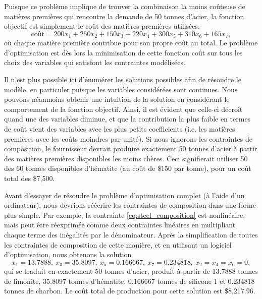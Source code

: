 \begin{example}
Puisque ce problème implique de trouver la combinaison la moins coûteuse de matières premières qui rencontre la demande de 50 tonnes d'acier, la fonction objectif est simplement le coût des matières premières utilisées:
\[
\mbox{coût} = 200 x_1 + 250 x_2 + 150 x_3 + 220 x_4 + 300 x_5 + 310 x_6 + 165 x_7,
\]
où chaque matière première contribue pour son propre coût au total.
Le problème d'optimisation est dès lors la minimisation de cette fonction coût sur tous les choix des variables qui satisfont les contraintes modélisées.

Il n'est plus possible ici d'énumérer les solutions possibles afin de résoudre le modèle, en particuler puisque les variables considérées sont continues.
Nous pouvons néanmoins obtenir une intuition de la solution en considérant le comportement de la fonction objectif.
Ainsi, il est évident que celle-ci décroît quand une des variables diminue, et que la contribution la plus faible en termes de coût vient des variables avec les plus petits coefficients (i.e. les matières premières avec les coûts moindres par unité).
Si nous ignorons les contraintes de composition, le fournisseur devrait produire exactement 50 tonnes d'acier à partir des matières premières disponibles les moins chères.
Ceci signifierait utiliser 50 des 60 tonnes disponibles d'hématite (au coût de \$150 par tonne), pour un coût total des \$7,500.

Avant d'essayer de résoudre le problème d'optimisation complet (à l'aide d'un ordinateur), nous devrions réécrire les contraintes de composition dans une forme plus simple.
Par exemple, la contrainte \ref{eq:steel_composition} est nonlinéaire, mais peut être réexprimée comme deux contraintes linéaires en multipliant chaque terme des inégalités par le dénominateur.
Après la simplification de toutes les contraintes de composition de cette manière, et en utilisant un logiciel d'optimisation, nous obtenons la solution
\[
x_1 = 13.7888,\ x_3 = 35.8097,\ x_5 = 0.166667,\ x_7 = 0.234818,\ x_2 = x_4 = x_6 = 0,
\]
qui se traduit en exactement 50 tonnes d'acier, produit à partir de 13.7888 tonnes de limonite, 35.8097 tonnes d'hématite, 0.166667 tonnes de silicone 1 et 0.234818 tonnes de charbon.
Le coût total de production pour cette solution est \$8,217.96.
\end{example}
